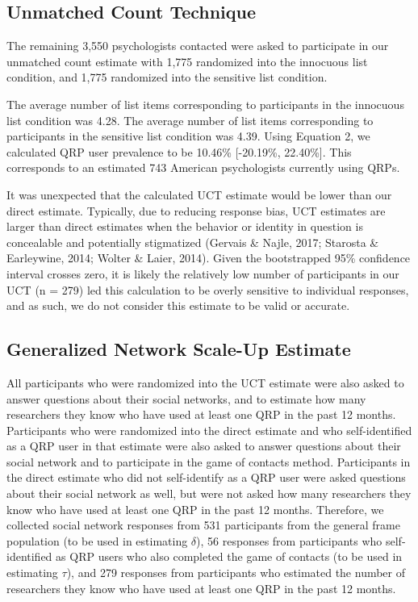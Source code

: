 \documentclass[jou]{apa6}
\theoremstyle{definition}
\theoremstyle{definition}
\theoremstyle{definition}
\theoremstyle{remark}
\begin{document}
\subsection{Unmatched Count
Technique}\label{unmatched-count-technique-1}

The remaining 3,550 psychologists contacted were asked to participate in
our unmatched count estimate with 1,775 randomized into the innocuous
list condition, and 1,775 randomized into the sensitive list condition.

The average number of list items corresponding to participants in the
innocuous list condition was 4.28. The average number of list items
corresponding to participants in the sensitive list condition was 4.39.
Using Equation 2, we calculated QRP user prevalence to be 10.46\%
{[}-20.19\%, 22.40\%{]}. This corresponds to an estimated 743 American
psychologists currently using QRPs.

It was unexpected that the calculated UCT estimate would be lower than
our direct estimate. Typically, due to reducing response bias, UCT
estimates are larger than direct estimates when the behavior or identity
in question is concealable and potentially stigmatized (Gervais \&
Najle, 2017; Starosta \& Earleywine, 2014; Wolter \& Laier, 2014). Given
the bootstrapped 95\% confidence interval crosses zero, it is likely the
relatively low number of participants in our UCT (n = 279) led this
calculation to be overly sensitive to individual responses, and as such,
we do not consider this estimate to be valid or accurate.

\subsection{Generalized Network Scale-Up
Estimate}\label{generalized-network-scale-up-estimate}

All participants who were randomized into the UCT estimate were also
asked to answer questions about their social networks, and to estimate
how many researchers they know who have used at least one QRP in the
past 12 months. Participants who were randomized into the direct
estimate and who self-identified as a QRP user in that estimate were
also asked to answer questions about their social network and to
participate in the game of contacts method. Participants in the direct
estimate who did not self-identify as a QRP user were asked questions
about their social network as well, but were not asked how many
researchers they know who have used at least one QRP in the past 12
months. Therefore, we collected social network responses from 531
participants from the general frame population (to be used in estimating
\(\delta\)), 56 responses from participants who self-identified as QRP
users who also completed the game of contacts (to be used in estimating
\(\tau\)), and 279 responses from participants who estimated the number
of researchers they know who have used at least one QRP in the past 12
months.
\end{document}

